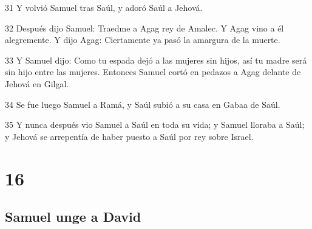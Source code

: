 \par 31 Y volvió Samuel tras Saúl, y adoró Saúl a Jehová.
\par 32 Después dijo Samuel: Traedme a Agag rey de Amalec. Y Agag vino a él alegremente. Y dijo Agag: Ciertamente ya pasó la amargura de la muerte.
\par 33 Y Samuel dijo: Como tu espada dejó a las mujeres sin hijos, así tu madre será sin hijo entre las mujeres. Entonces Samuel cortó en pedazos a Agag delante de Jehová en Gilgal.
\par 34 Se fue luego Samuel a Ramá, y Saúl subió a su casa en Gabaa de Saúl.
\par 35 Y nunca después vio Samuel a Saúl en toda su vida; y Samuel lloraba a Saúl; y Jehová se arrepentía de haber puesto a Saúl por rey sobre Israel.

\chapter{16}

\section*{Samuel unge a David}

